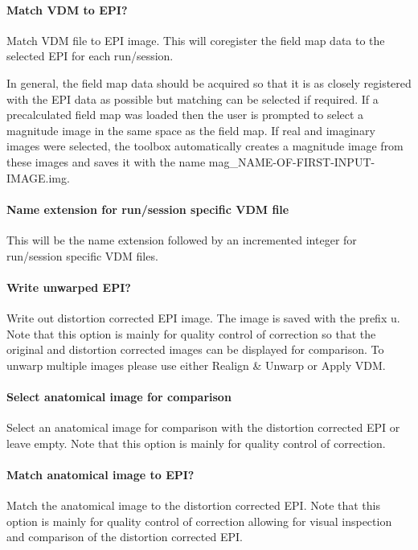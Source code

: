 \paragraph{Match VDM to EPI?}
Match VDM file to EPI image. This will coregister the field map data to the selected EPI for each run/session.

In general, the field map data should be acquired so that it is as closely registered with the EPI data as possible but matching can be selected if required. If a precalculated field map was loaded then the user is prompted to select a magnitude image in the same space as the field map. If real and imaginary images were selected, the toolbox automatically creates a magnitude image from these images and saves it with the name mag\_NAME-OF-FIRST-INPUT-IMAGE.img. 

\paragraph{Name extension for run/session specific VDM file}
This will be the name extension followed by an incremented integer for run/session specific VDM files.


\paragraph{Write unwarped EPI?}
Write out distortion corrected EPI image. The image is saved with the prefix u. Note that this option is mainly for quality control of correction so that the original and distortion corrected images can be displayed for comparison. To unwarp multiple images please use either Realign \& Unwarp or Apply VDM.


\paragraph{Select anatomical image for comparison}
Select an anatomical image for comparison with the distortion corrected EPI or leave empty. Note that this option is mainly for quality control of correction.


\paragraph{Match anatomical image to EPI?}
Match the anatomical image to the distortion corrected EPI. Note that this option is mainly for quality control of correction allowing for visual inspection and comparison of the distortion corrected EPI.


